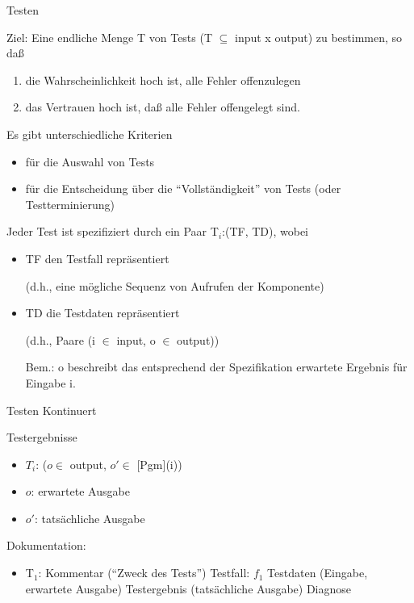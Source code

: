 \newpage

\centerline{Testen}  

\bigskip

Ziel: Eine endliche Menge T von Tests (T $\subseteq$ input x output)
zu bestimmen, so da{\ss} 
\begin{enumerate}
\item die Wahrscheinlichkeit hoch ist, alle Fehler offenzulegen
\item das Vertrauen hoch ist, da{\ss} alle Fehler offengelegt sind.
\end{enumerate}

Es gibt unterschiedliche Kriterien
\begin{itemize}
\item f\"ur die Auswahl von Tests
\item f\"ur die Entscheidung \"uber die ``Vollst\"andigkeit'' von
Tests (oder Testterminierung)
\end{itemize}

Jeder Test ist spezifiziert durch ein Paar T$_i$:(TF, TD), wobei
\begin{itemize}

\item TF den Testfall repr\"asentiert

(d.h., eine m\"ogliche Sequenz von Aufrufen der Komponente)

\item TD die Testdaten repr\"asentiert

(d.h., Paare (i $\in$ input, o $\in$ output))

Bem.: o beschreibt das entsprechend der Spezifikation erwartete
Ergebnis f\"ur Eingabe i.

\end{itemize}


\newpage
\centerline{Testen Kontinuert}
\bigskip

Testergebnisse

\begin{itemize}

\item $T_i$: ($o \in$ output, $o' \in$ [Pgm](i))

\item $o$: erwartete Ausgabe

\item $o'$: tats\"achliche Ausgabe

\end{itemize}


Dokumentation:
\begin{itemize}

\item T$_1$: Kommentar (``Zweck des Tests'')
\subitem Testfall: $f_1$
\subitem Testdaten (Eingabe, erwartete Ausgabe)
\subitem Testergebnis (tats\"achliche Ausgabe)
\subitem Diagnose
\end{itemize}

